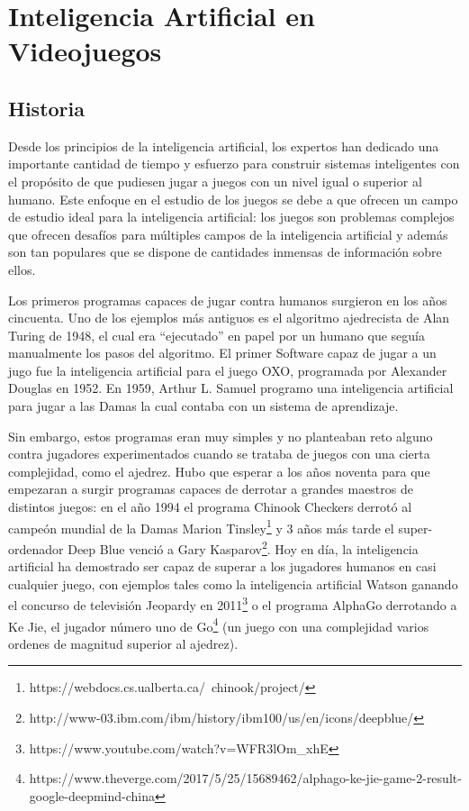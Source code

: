 \section{Inteligencia Artificial en Videojuegos}
\subsection{Historia}
Desde los principios de la inteligencia artificial, los expertos han dedicado una importante cantidad de tiempo y esfuerzo para construir sistemas inteligentes con el propósito de que pudiesen jugar a juegos con un nivel igual o superior al humano. Este enfoque en el estudio de los juegos se debe a que ofrecen un campo de estudio ideal para la inteligencia artificial: los juegos son problemas complejos que ofrecen desafíos para múltiples campos de la inteligencia artificial y además son tan populares que se dispone de cantidades inmensas de información sobre ellos\cite{ai_and_games}.

Los primeros programas capaces de jugar contra humanos surgieron en los años cincuenta. Uno de los ejemplos más antiguos es el algoritmo ajedrecista de Alan Turing de 1948\cite{turing_chess}, el cual era ``ejecutado'' en papel por un humano que seguía manualmente los pasos del algoritmo. El primer Software capaz de jugar a un jugo fue la inteligencia artificial para el juego OXO, programada por Alexander Douglas en 1952. En 1959, Arthur L. Samuel\cite{machine_learning} programo una inteligencia artificial para jugar a las Damas la cual contaba con un sistema de aprendizaje. 

Sin embargo, estos programas eran muy simples y no planteaban reto alguno contra jugadores experimentados cuando se trataba de juegos con una cierta complejidad, como el ajedrez. Hubo que esperar a los años noventa para que empezaran a surgir programas capaces de derrotar a grandes maestros de distintos juegos: en el año 1994 el programa Chinook Checkers derrotó al campeón mundial de la Damas Marion Tinsley\footnote{https://webdocs.cs.ualberta.ca/~chinook/project/} y 3 años más tarde el super-ordenador Deep Blue venció a Gary Kasparov\footnote{http://www-03.ibm.com/ibm/history/ibm100/us/en/icons/deepblue/}. Hoy en día, la inteligencia artificial ha demostrado ser capaz de superar a los jugadores humanos en casi cualquier juego, con ejemplos tales como la inteligencia artificial Watson ganando el concurso de televisión Jeopardy en 2011\footnote{https://www.youtube.com/watch?v=WFR3lOm\_xhE} o el programa AlphaGo derrotando a Ke Jie, el jugador número uno de Go\footnote{https://www.theverge.com/2017/5/25/15689462/alphago-ke-jie-game-2-result-google-deepmind-china} (un juego con una complejidad varios ordenes de magnitud superior al ajedrez).

